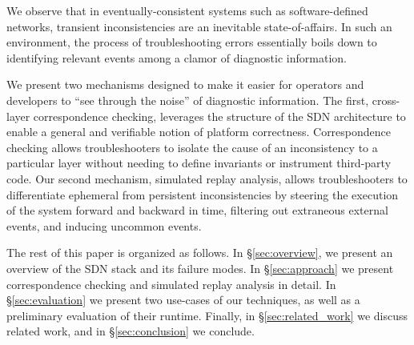 We observe that in eventually-consistent systems such as software-defined networks,
transient inconsistencies are an inevitable state-of-affairs.
In such an environment, the process of troubleshooting errors essentially boils down to
identifying relevant events among a clamor of diagnostic information.

We present two mechanisms designed to make it easier for operators and
developers to ``see through the noise'' of diagnostic information. The first,
cross-layer correspondence checking, leverages the structure of the SDN
architecture to enable a general and verifiable notion of platform
correctness. Correspondence checking allows troubleshooters to isolate the cause of 
an inconsistency to a particular layer without needing to define invariants or
instrument third-party code. Our second
mechanism, simulated replay analysis, allows troubleshooters 
to differentiate ephemeral from persistent inconsistencies by steering the
execution of the system forward and backward in time, filtering out extraneous
external events, and inducing uncommon events. 

The rest of this paper is organized as follows. In \S\ref{sec:overview},
we present an overview of the SDN stack and its failure modes.
In \S\ref{sec:approach} we present correspondence checking and simulated
replay analysis in detail. In \S\ref{sec:evaluation} we present
two use-cases of our techniques, as well as a preliminary evaluation
of their runtime. Finally, in \S\ref{sec:related_work} we discuss related work,
and in \S\ref{sec:conclusion} we conclude.
